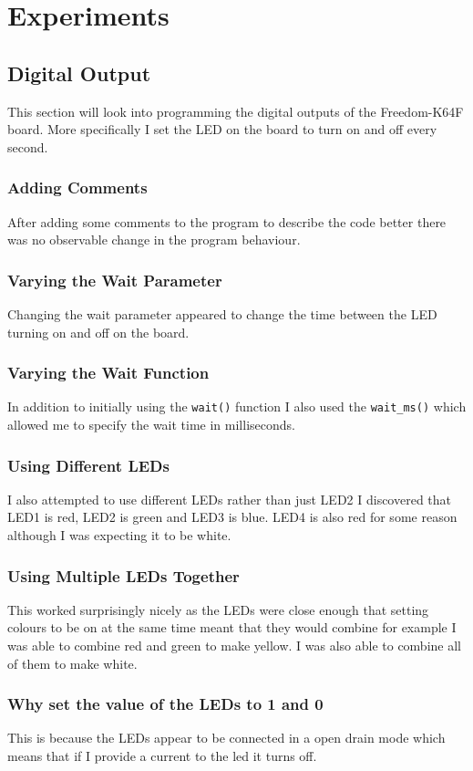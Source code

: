 \documentclass[a4paper,12pt]{scrartcl}
\begin{document}
	\section{Experiments}
	{
		\subsection{Digital Output}
		{
			This section will look into programming the digital outputs of the Freedom-K64F board. More specifically I set the LED on the board to turn on and off every second.
			\subsubsection{Adding Comments}
			{
				After adding some comments to the program to describe the code better there was no observable change in the program behaviour. 
			}
			\subsubsection{Varying the Wait Parameter}
			{
				Changing the wait parameter appeared to change the time between the LED turning on and off on the board.
			}
			\subsubsection{Varying the Wait Function}
			{
				In addition to initially using the \lstinline|wait()| function I also used the \lstinline|wait_ms()| which allowed me to specify the wait time in milliseconds.
			}
			\subsubsection{Using Different LEDs}
			{
				I also attempted to use different LEDs rather than just LED2 I discovered that LED1 is red, LED2 is green and LED3 is blue. LED4 is also red for some reason although I was expecting it to be white.
			}
			\subsubsection{Using Multiple LEDs Together}
			{
				This worked surprisingly nicely as the LEDs were close enough that setting colours to be on at the same time meant that they would combine for example I was able to combine red and green to make yellow. I was also able to combine all of them to make white. 
			}
			\subsubsection{Why set the value of the LEDs to 1 and 0}
			{
				This is because the LEDs appear to be connected in a open drain mode which means that if I provide a current to the led it turns off.
			}
		}
}
\end{document}
